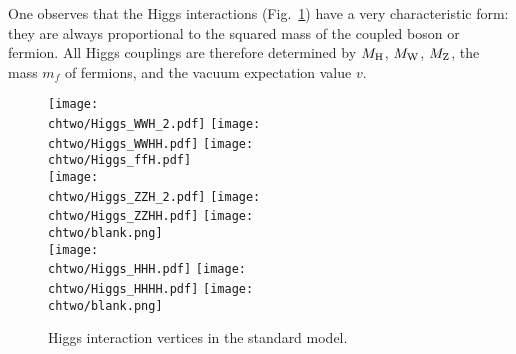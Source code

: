One observes that the Higgs interactions (Fig.~\ref{fig:HiggsSM}) have a very characteristic form: they are always proportional to the squared mass of the coupled boson or fermion.
All Higgs couplings are therefore determined by $M_\mathrm{H}$, $M_\mathrm{W}$, $M_\mathrm{Z}$, the mass $m_f$ of fermions, and the vacuum expectation value $v$.

\begin{figure}[!htb]
\centering
\texttt{[image: \\chtwo/Higgs\_WWH\_2.pdf]}\hspace{0.4cm}
\texttt{[image: \\chtwo/Higgs\_WWHH.pdf]}\hspace{0.4cm}
\texttt{[image: \\chtwo/Higgs\_ffH.pdf]}\\ \vspace{0.4cm}
\texttt{[image: \\chtwo/Higgs\_ZZH\_2.pdf]}\hspace{0.4cm}
\texttt{[image: \\chtwo/Higgs\_ZZHH.pdf]}
\texttt{[image: \\chtwo/blank.png]}\\ \vspace{0.4cm}
\texttt{[image: \\chtwo/Higgs\_HHH.pdf]}\hspace{0.4cm}
\texttt{[image: \\chtwo/Higgs\_HHHH.pdf]}
\texttt{[image: \\chtwo/blank.png]}\\
\caption{Higgs interaction vertices in the standard model.}
\label{fig:HiggsSM}
\end{figure}


